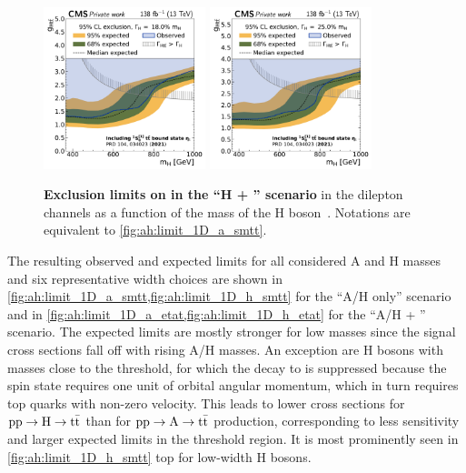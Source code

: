 \begin{figure}[!ph]
    \\
    \includegraphics[width=0.42\textwidth]{figures/ah/limits_etat_w2p8/H_limit_w18p0_g-scan_highrange.pdf}%
    \hspace*{0.05\textwidth}%
    \includegraphics[width=0.42\textwidth]{figures/ah/limits_etat_w2p8/H_limit_w25p0_g-scan_highrange.pdf}
    \caption{%
        \textbf{Exclusion limits on \gHtt in the ``H + \etat'' scenario} in the dilepton channels as a function of the mass of the H boson~\cite{CMS:HIG-22-013}. Notations are equivalent to \cref{fig:ah:limit_1D_a_smtt}.
    }
    \label{fig:ah:limit_1D_h_etat}
\end{figure}

The resulting observed and expected limits for all considered A and H masses and six representative width choices are shown in \cref{fig:ah:limit_1D_a_smtt,fig:ah:limit_1D_h_smtt} for the ``A/H only'' scenario and in \cref{fig:ah:limit_1D_a_etat,fig:ah:limit_1D_h_etat} for the ``A/H + \etat'' scenario.
The expected limits are mostly stronger for low masses since the signal cross sections fall off with rising A/H masses. An exception are H bosons with masses close to the threshold, for which the decay to \ttbar is suppressed because the  spin state requires one unit of orbital angular momentum, which in turn requires top quarks with non-zero velocity. This leads to lower cross sections for $\mathrm{pp \rightarrow H \rightarrow \mathrm{t \bar{t}}}$ than for $\mathrm{pp \rightarrow A \rightarrow \mathrm{t \bar{t}}}$ production, corresponding to less sensitivity and larger expected limits in the \ttbar threshold region. It is most prominently seen in \cref{fig:ah:limit_1D_h_smtt} top for low-width H bosons.

